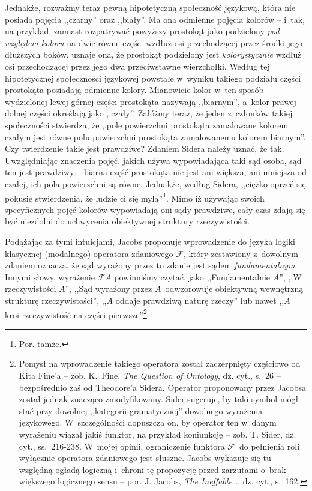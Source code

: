 Jednakże, rozważmy teraz pewną hipotetyczną społeczność językową, która nie posiada pojęcia ,,czarny'' oraz ,,biały''. Ma ona odmienne pojęcia kolorów -- i~tak, na przykład, zamiast rozpatrywać powyższy prostokąt jako podzielony \textit{pod względem koloru} na dwie równe części wzdłuż osi przechodzącej przez środki jego dłuższych boków, uznaje ona, że prostokąt podzielony jest \textit{kolorystycznie} wzdłuż osi przechodzącej przez jego dwa przeciwstawne wierzchołki. Według tej hipotetycznej społeczności językowej powstałe w~wyniku takiego podziału części prostokąta posiadają odmienne kolory. Mianowicie kolor w~ten sposób wydzielonej lewej górnej części prostokąta nazywają ,,biarnym'', a~kolor prawej dolnej części określają jako ,,czały''. Załóżmy teraz, że jeden z~członków takiej społeczności stwierdza, że ,,pole powierzchni prostokąta zamalowane kolorem czałym jest równe polu powierzchni prostokąta zamalowanemu kolorem biarnym''. Czy twierdzenie takie jest prawdziwe? Zdaniem Sidera należy uznać, że tak. Uwzględniając znaczenia pojęć, jakich używa wypowiadająca taki sąd osoba, sąd ten jest prawdziwy -- biarna część prostokąta nie jest ani większa, ani mniejsza od czałej, ich pola powierzchni są równe. Jednakże, według Sidera, ,,ciężko oprzeć się pokusie stwierdzenia, że ludzie ci się mylą''\footnote{Por. tamże.}. Mimo iż używając swoich specyficznych pojęć kolorów wypowiadają oni sądy prawdziwe, cały czas zdają się być niezdolni do uchwycenia obiektywnej struktury rzeczywistości.

Podążając za tymi intuicjami, Jacobs proponuje wprowadzenie do języka logiki klasycznej (modalnego) operatora zdaniowego $\mathscr{F}$, który zestawiony z~dowolnym zdaniem oznacza, że sąd wyrażony przez to zdanie jest sądem \textit{fundamentalnym}. Innymi słowy, wyrażenie $\mathscr{F}A$ powinniśmy czytać, jako ,,Fundamentalnie $A$'', ,,W rzeczywistości $A$'', ,,Sąd wyrażony przez $A$~odwzorowuje obiektywną wewnętrzną strukturę rzeczywistości'', ,,$A$ oddaje prawdziwą naturę rzeczy'' lub nawet ,,$A$ kroi rzeczywistość na części pierwsze''\footnote{Pomysł na wprowadzenie takiego operatora został zaczerpnięty częściowo od Kita Fine'a -- zob. K.~Fine, \textit{The Question of Ontology}, dz. cyt., s.~26 -- bezpośrednio zaś od Theodore'a Sidera. Operator proponowany przez Jacobsa został jednak znacząco zmodyfikowany. Sider sugeruje, by taki symbol mógł stać przy dowolnej ,,kategorii gramatycznej'' dowolnego wyrażenia językowego. W~szczególności dopuszcza on, by operator ten w~danym wyrażeniu wiązał jakiś funktor, na przykład koniunkcję -- zob. T. Sider, dz. cyt., ss.~216-238. W~mojej opinii, ograniczenie funktora $\mathscr{F}$~do pełnienia roli wyłącznie operatora zdaniowego jest słuszne. Jacobs wykazuje się tu względną ogładą logiczną i~chroni tę propozycję przed zarzutami o~brak większego logicznego sensu -- por. J. Jacobs, \textit{The Ineffable}\ldots, dz. cyt., s.~162.}.


